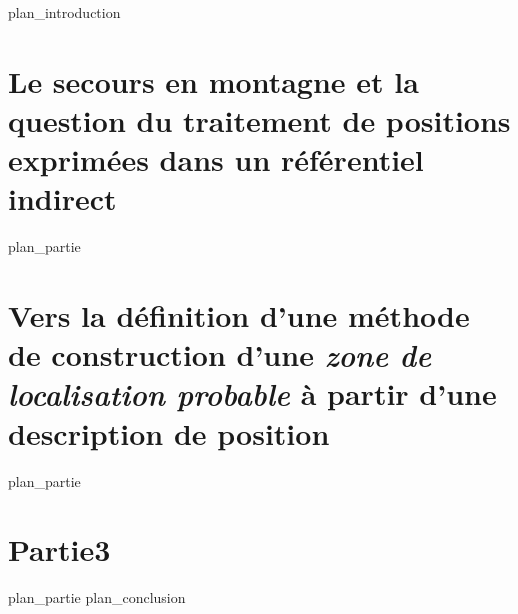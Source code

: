 \label{part:int}
{plan_introduction}
\part{Le secours en montagne et la question du traitement de positions exprimées dans un référentiel indirect}
\label{part:01}
{plan_partie}
\part{Vers la définition d'une méthode de construction d'une
  \emph{zone de localisation probable} à partir d'une description de
  position}
\label{part:02}
{plan_partie}
\part{Partie3}
\label{part:03}
{plan_partie}
\label{part:cnl}
{plan_conclusion}

